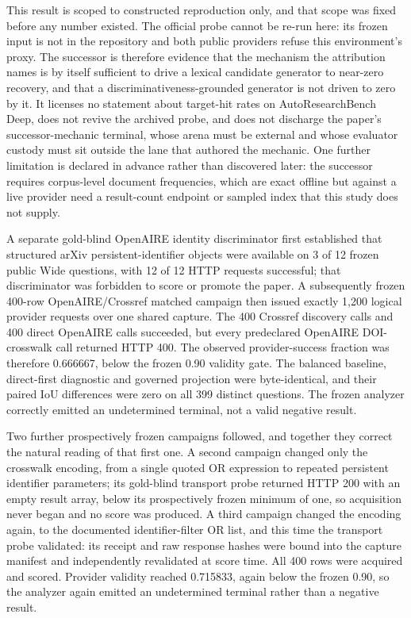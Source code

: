 This result is scoped to constructed reproduction only, and that scope was
fixed before any number existed.  The official probe cannot be re-run here: its
frozen input is not in the repository and both public providers refuse this
environment's proxy.  The successor is therefore evidence that the mechanism the
attribution names is by itself sufficient to drive a lexical candidate generator
to near-zero recovery, and that a discriminativeness-grounded generator is not
driven to zero by it.  It licenses no statement about target-hit rates on
AutoResearchBench Deep, does not revive the archived probe, and does not
discharge the paper's successor-mechanic terminal, whose arena must be external
and whose evaluator custody must sit outside the lane that authored the
mechanic.  One further limitation is declared in advance rather than discovered
later: the successor requires corpus-level document frequencies, which are exact
offline but against a live provider need a result-count endpoint or sampled
index that this study does not supply.

A separate gold-blind OpenAIRE identity discriminator first established that
structured arXiv persistent-identifier objects were available on 3 of 12 frozen
public Wide questions, with 12 of 12 HTTP requests successful; that discriminator
was forbidden to score or promote the paper.  A subsequently frozen 400-row
OpenAIRE/Crossref matched campaign then issued exactly 1,200 logical provider
requests over one shared capture.  The 400 Crossref discovery calls and 400
direct OpenAIRE calls succeeded, but every predeclared OpenAIRE DOI-crosswalk
call returned HTTP 400.  The observed provider-success fraction was therefore
0.666667, below the frozen 0.90 validity gate.  The balanced baseline,
direct-first diagnostic and governed projection were byte-identical, and their
paired IoU differences were zero on all 399 distinct questions.  The frozen
analyzer correctly emitted an undetermined terminal, not a
valid negative result.

Two further prospectively frozen campaigns followed, and together they correct
the natural reading of that first one.  A second campaign changed only the
crosswalk encoding, from a single quoted OR expression to repeated persistent
identifier parameters; its gold-blind transport probe returned HTTP 200 with an
empty result array, below its prospectively frozen minimum of one, so
acquisition never began and no score was produced.  A third campaign changed the
encoding again, to the documented identifier-filter OR list, and this time the
transport probe validated: its receipt and raw response hashes were bound into
the capture manifest and independently revalidated at score time.  All 400 rows
were acquired and scored.  Provider validity reached 0.715833, again below the
frozen 0.90, so the analyzer again emitted an undetermined terminal
rather than a negative result.

